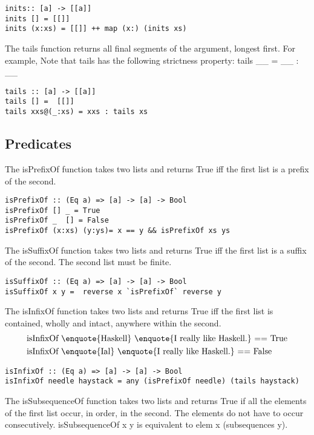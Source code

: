 \begin{lstlisting}[frame=single]
inits:: [a] -> [[a]]
inits [] = [[]]
inits (x:xs) = [[]] ++ map (x:) (inits xs)
\end{lstlisting}

The tails function returns all final segments of the argument, longest first. For example,
Note that tails has the following strictness property: tails \_\textbar\_ = \_\textbar\_ : \_\textbar\_
\begin{lstlisting}[frame=single]
tails :: [a] -> [[a]]
tails [] =  [[]]
tails xxs@(_:xs) = xxs : tails xs
\end{lstlisting}

\subsection{Predicates}
The isPrefixOf function takes two lists and returns True iff the first list is a prefix of the second.
\begin{lstlisting}[frame=single]
isPrefixOf :: (Eq a) => [a] -> [a] -> Bool
isPrefixOf [] _ = True
isPrefixOf _  [] = False
isPrefixOf (x:xs) (y:ys)= x == y && isPrefixOf xs ys
\end{lstlisting}

The isSuffixOf function takes two lists and returns True iff the first list is a suffix of the second. The second list must be finite.
\begin{lstlisting}[frame=single]
isSuffixOf :: (Eq a) => [a] -> [a] -> Bool
isSuffixOf x y =  reverse x `isPrefixOf` reverse y
\end{lstlisting}

The isInfixOf function takes two lists and returns True iff the first list is contained, wholly and intact, anywhere within the second.
\begin{align*}
	&\text{isInfixOf \enquote{Haskell} \enquote{I really like Haskell.} == True}\\
	&\text{isInfixOf \enquote{Ial} \enquote{I really like Haskell.} == False}
\end{align*}
\begin{lstlisting}[frame=single]
isInfixOf :: (Eq a) => [a] -> [a] -> Bool
isInfixOf needle haystack = any (isPrefixOf needle) (tails haystack)
\end{lstlisting}

The isSubsequenceOf function takes two lists and returns True if all the elements of the first list occur, in order, in the second. The elements do not have to occur consecutively.
isSubsequenceOf x y is equivalent to elem x (subsequences y).
\skipped